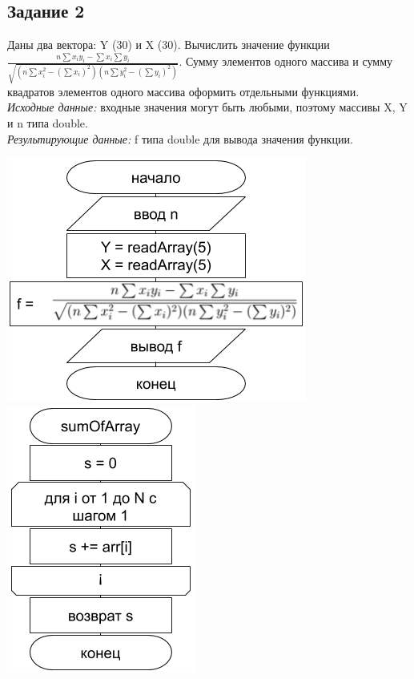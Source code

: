 \documentclass[a4paper,14pt]{extarticle}
\begin{document}
\subsection{Задание 2}
Даны два вектора: Y (30) и X (30). Вычислить значение функции\\ $ \displaystyle\frac{n\sum x_{i}y_{i} - \sum x_{i} \sum y_{i}}{\sqrt{(n \sum x_{i}^{2} - (\sum x_{i})^{2})(n \sum y_{i}^{2} - (\sum y_{i})^{2})}} $. Сумму элементов одного массива и сумму квадратов элементов одного массива оформить отдельными функциями.\\
\textit{Исходные данные:} входные значения могут быть любыми, поэтому массивы X, Y и n типа double.\\
\textit{Результирующие данные:} f типа double для вывода значения функции.\\
\begin{center}
\includegraphics[scale=0.6]{lab5-2.png}\\
\vspace{0.3cm}
\includegraphics[scale=0.6]{lab5-2-1.png}

\end{center}
\end{document}
